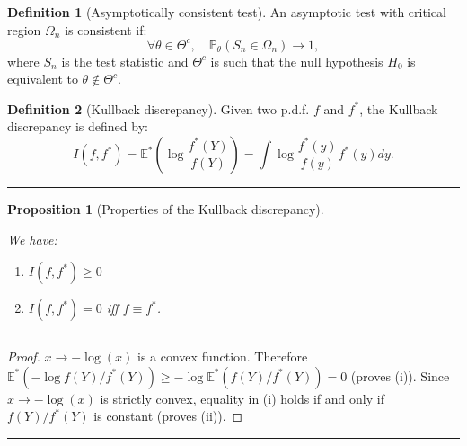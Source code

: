 \documentclass[
]{book}
\newtheorem{proposition}{Proposition}[chapter]
\theoremstyle{definition}
\newtheorem{definition}{Definition}[chapter]
\theoremstyle{definition}
\theoremstyle{definition}
\theoremstyle{definition}
\theoremstyle{remark}
\begin{document}
\begin{definition}[Asymptotically consistent test]
\protect\hypertarget{def:asmyptconsisttest}{}\label{def:asmyptconsisttest}An asymptotic test with critical region \(\Omega_n\) is consistent if:
\[
\forall \theta \in \Theta^c, \quad \mathbb{P}_\theta (S_n \in \Omega_n) \rightarrow 1,
\]
where \(S_n\) is the test statistic and \(\Theta^c\) is such that the null hypothesis \(H_0\) is equivalent to \(\theta \notin \Theta^c\).
\end{definition}

\begin{definition}[Kullback discrepancy]
\protect\hypertarget{def:Kullback}{}\label{def:Kullback}Given two p.d.f. \(f\) and \(f^*\), the Kullback discrepancy is defined by:
\[
I(f,f^*) = \mathbb{E}^* \left( \log \frac{f^*(Y)}{f(Y)} \right) = \int \log \frac{f^*(y)}{f(y)} f^*(y) dy.
\]
\end{definition}

\begin{center}\rule{0.5\linewidth}{0.5pt}\end{center}

\begin{proposition}[Properties of the Kullback discrepancy]
\protect\hypertarget{prp:Kullback}{}\label{prp:Kullback}

We have:

\begin{enumerate}
\def\labelenumi{\roman{enumi}.}
\item
  \(I(f,f^*) \ge 0\)
\item
  \(I(f,f^*) = 0\) iff \(f \equiv f^*\).
\end{enumerate}

\end{proposition}

\begin{center}\rule{0.5\linewidth}{0.5pt}\end{center}

\begin{proof}
\(x \rightarrow -\log(x)\) is a convex function. Therefore \(\mathbb{E}^*(-\log f(Y)/f^*(Y)) \ge -\log \mathbb{E}^*(f(Y)/f^*(Y)) = 0\) (proves (i)). Since \(x \rightarrow -\log(x)\) is strictly convex, equality in (i) holds if and only if \(f(Y)/f^*(Y)\) is constant (proves (ii)).
\end{proof}

\begin{center}\rule{0.5\linewidth}{0.5pt}\end{center}
\end{document}
